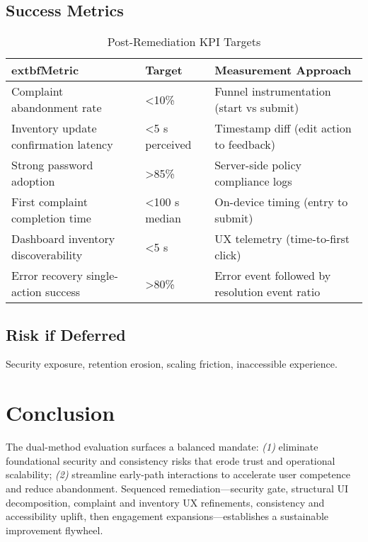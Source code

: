 \documentclass[11pt,a4paper]{article}
\begin{document}
\subsection{Success Metrics}
\begin{table}[h]
	\centering
	\caption{Post-Remediation KPI Targets}\label{tab:kpis}
	\renewcommand{\arraystretch}{1.12}
	\begin{tabular}{|p{5.2cm}|p{2.4cm}|p{6.2cm}|}
		\hline
			extbf{Metric} & \textbf{Target} & \textbf{Measurement Approach} \\
		\hline
		Complaint abandonment rate & <10\% & Funnel instrumentation (start vs submit) \\
		\hline
		Inventory update confirmation latency & <5 s perceived & Timestamp diff (edit action to feedback) \\
		\hline
		Strong password adoption & >85\% & Server-side policy compliance logs \\
		\hline
		First complaint completion time & <100 s median & On-device timing (entry to submit) \\
		\hline
		Dashboard inventory discoverability & <5 s & UX telemetry (time-to-first click) \\
		\hline
		Error recovery single-action success & >80\% & Error event followed by resolution event ratio \\
		\hline
	\end{tabular}
\end{table}

\subsection{Risk if Deferred}
Security exposure, retention erosion, scaling friction, inaccessible experience.

\section*{Conclusion}
The dual-method evaluation surfaces a balanced mandate: \emph{(1)} eliminate foundational security and consistency risks that erode trust and operational scalability; \emph{(2)} streamline early-path interactions to accelerate user competence and reduce abandonment. Sequenced remediation—security gate, structural UI decomposition, complaint and inventory UX refinements, consistency and accessibility uplift, then engagement expansions—establishes a sustainable improvement flywheel.

\appendix
\end{document}
